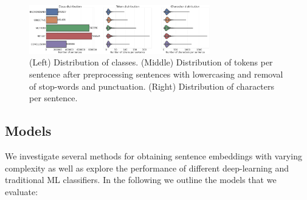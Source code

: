 \begin{figure}[t]
    \centering
    \includegraphics[width=0.70\textwidth]{figures/distributions_no_treshold.png}
    \caption{(Left) Distribution of classes. (Middle) Distribution of tokens per sentence after preprocessing sentences with lowercasing and removal of stop-words and punctuation. (Right) Distribution of characters per sentence.}
    \label{fig:distributions}
\end{figure}


\subsection{Models}
We investigate several methods for obtaining sentence embeddings with varying complexity as well as explore the performance of different deep-learning and traditional ML classifiers. In the following we outline the models that we evaluate:

